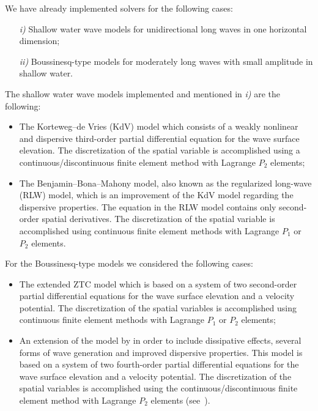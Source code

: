 We have already implemented solvers for the following cases:
\begin{itemize}
\item[{\it i)}] Shallow water wave models for unidirectional
  long waves in one horizontal dimension;
\item[{\it ii)}] Boussinesq-type models for moderately long
  waves with small amplitude in shallow water.
\end{itemize}
The shallow water wave models implemented and mentioned in {\it i)} are the following:
\begin{itemize}
\item The Korteweg--de Vries (KdV) model which consists of a
  weakly nonlinear and dispersive third-order partial
  differential equation for the wave surface elevation. The
  discretization of the spatial variable is accomplished
  using a continuous/discontinuous finite element method
  with Lagrange $P_2$ elements;

\item The Benjamin--Bona--Mahony model, also known as the
  regularized long-wave (RLW) model, which is an improvement
  of the KdV model regarding the dispersive properties.  The
  equation in the RLW model contains only second-order
  spatial derivatives. The discretization of the
  spatial variable is accomplished using continuous finite
  element methods with Lagrange $P_1$ or $P_2$ elements.
\end{itemize}
For the Boussinesq-type models we considered the following
cases:
\begin{itemize}
\item The extended ZTC model which is based on
  a system of two second-order partial differential
  equations for the wave surface elevation and a velocity
  potential. The discretization of the spatial variables is
  accomplished using continuous finite element methods with
  Lagrange $P_1$ or $P_2$ elements;

 \item An extension of the model by \citet{ChenLiu1994} in
   order to include dissipative effects, several forms of
   wave generation and improved dispersive properties.  This
   model is based on a system of two fourth-order partial
   differential equations for the wave surface elevation and
   a velocity potential. The discretization of the spatial
   variables is accomplished using the
   continuous/discontinuous finite element method with
   Lagrange $P_2$ elements
   (see~\citet{LopesPereiraTrabucho}).
\end{itemize}

